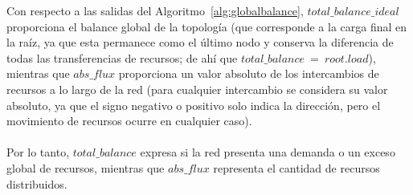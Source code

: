 Con respecto a las salidas del Algoritmo~\ref{alg:globalbalance}, $total\_balance\_ideal$ proporciona el balance global de la topología (que corresponde a la carga final en la raíz, ya que esta permanece como el último nodo y conserva la diferencia de todas las transferencias de recursos; de ahí que $total\_balance \: = \: root.load$), mientras que $abs\_flux$ proporciona un valor absoluto de los intercambios de recursos a lo largo de la red (para cualquier intercambio se considera su valor absoluto, ya que el signo negativo o positivo solo indica la dirección, pero el movimiento de recursos ocurre en cualquier caso). \\
\\
Por lo tanto, $total\_balance$ expresa si la red presenta una demanda o un exceso global de recursos, mientras que $abs\_flux$ representa el cantidad de recursos distribuidos. 

